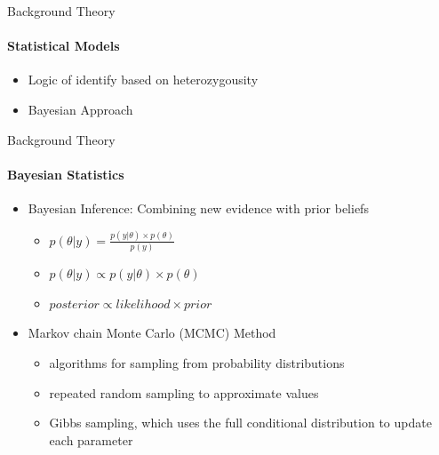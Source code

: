 \documentclass[letter,graphicx]{beamer}
\begin{document}
\begin{frame}{Background Theory}
\framesubtitle{Statistical Models}
   \begin{itemize}
   	\item Logic of identify based on heterozygousity
	\item Bayesian Approach
   \end{itemize}
\end{frame}

\begin{frame}{Background Theory}
\framesubtitle{Bayesian Statistics}
\begin{itemize}
\item Bayesian Inference: Combining new evidence with prior beliefs
	\vspace{1mm}
	\begin{itemize}
	\item $p(\theta|y) = \frac{p(y|\theta) \times p(\theta)}{p(y)}$
	\vspace{2mm}
	\item $p(\theta|y) \propto p(y|\theta) \times p(\theta)$
	\vspace{2mm}
	\item $posterior \propto likelihood \times prior$
	\end{itemize}
	\vspace{2mm}
\item Markov chain Monte Carlo (MCMC) Method
	\vspace{1mm}
	\begin{itemize}
	\item algorithms for sampling from probability distributions
	\vspace{2mm}
	\item repeated random sampling to approximate values
	\vspace{2mm}
	\item Gibbs sampling, which uses the full conditional distribution to update each parameter
	\end{itemize}
\end{itemize}
\end{frame}
\end{document}
